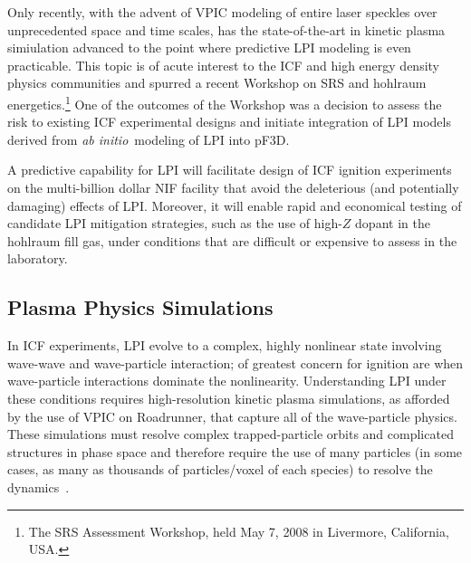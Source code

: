 \documentclass[journal,twoside]{IEEEtran}
\newcommand{\abinitio} {\textit{ab initio}}
\begin{document}
Only recently, with the advent of VPIC modeling of entire laser speckles over 
unprecedented space and time scales, has the state-of-the-art in kinetic 
plasma simiulation advanced to the point where predictive LPI modeling 
is even practicable.  This topic is of acute interest 
to the ICF and high energy density physics communities and spurred a recent 
Workshop on SRS and hohlraum energetics.\footnote{The SRS Assessment Workshop, 
held May 7, 2008 in Livermore, California, USA.}  
One of the outcomes of the Workshop was a decision to assess the 
risk to existing ICF experimental designs and initiate integration of 
LPI models derived from \abinitio\ modeling of LPI into pF3D.  

A predictive capability for LPI will facilitate design of ICF ignition experiments 
on the multi-billion dollar NIF facility that avoid the deleterious (and potentially
damaging) effects of LPI. Moreover, it will enable 
rapid and economical testing of candidate LPI mitigation strategies, such as the 
use of high-$Z$ dopant in the hohlraum fill gas, under conditions that are difficult or
expensive to assess in the laboratory.  


\subsection{Plasma Physics Simulations}

In ICF experiments, LPI evolve to a complex, highly nonlinear state
involving wave-wave and wave-particle interaction; of greatest concern
for ignition are when wave-particle interactions dominate the
nonlinearity.  Understanding LPI under these conditions requires
high-resolution kinetic plasma simulations, as afforded by the use of
VPIC on Roadrunner, that capture all of the wave-particle physics.
These simulations must resolve complex trapped-particle orbits and
complicated structures in phase space and therefore require the use of
many particles (in some cases, as many as thousands of particles/voxel
of each species) to resolve the
dynamics~\cite{Yin_et_al_Phys_Plasmas_2006}.
\end{document}
